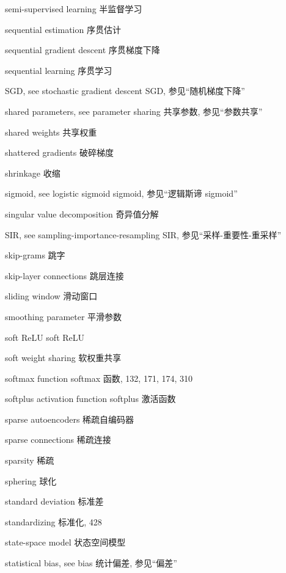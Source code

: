semi-supervised learning  半监督学习 \par
sequential estimation  序贯估计 \par
sequential gradient descent  序贯梯度下降 \par
sequential learning  序贯学习 \par
SGD, see stochastic gradient descent  SGD, 参见“随机梯度下降” \par
shared parameters, see parameter sharing  共享参数, 参见“参数共享” \par
shared weights  共享权重 \par
shattered gradients  破碎梯度 \par
shrinkage  收缩 \par
sigmoid, see logistic sigmoid  sigmoid, 参见“逻辑斯谛 sigmoid” \par
singular value decomposition  奇异值分解 \par
SIR, see sampling-importance-resampling  SIR, 参见“采样-重要性-重采样” \par
skip-grams  跳字 \par
skip-layer connections  跳层连接 \par
sliding window  滑动窗口 \par
smoothing parameter  平滑参数 \par
soft ReLU  soft ReLU \par
soft weight sharing  软权重共享 \par
softmax function  softmax 函数, 132, 171, 174, 310 \par
softplus activation function  softplus 激活函数 \par
sparse autoencoders  稀疏自编码器 \par
sparse connections  稀疏连接 \par
sparsity  稀疏 \par
sphering  球化 \par
standard deviation  标准差 \par
standardizing  标准化, 428 \par
state-space model  状态空间模型 \par
statistical bias, see bias  统计偏差, 参见“偏差” \par

